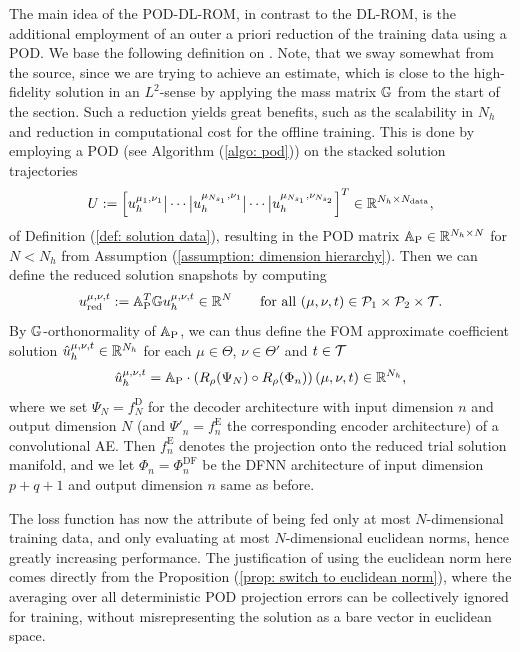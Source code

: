 The main idea of the POD-DL-ROM, in contrast to the DL-ROM, is the additional employment of an 
outer a priori reduction of the training data using a POD. We base the following definition on \cite{fresca2022}. 
Note, that we
sway somewhat from the source, since we are trying to achieve 
an estimate, which is close to the high-fidelity solution
in an $L^2$-sense by applying the
mass matrix $\mathbb{G}$ from the start of the section.
Such a reduction yields great benefits, such as the scalability in $N_h$ 
and reduction in computational cost for
the offline training. This is done by employing a POD (see Algorithm (\ref{algo: pod}))
on the stacked solution trajectories 
\begin{equation*}
    U := \left[u_h^{\mu_1, \nu_1} \big\vert \cdots \big\vert u_h^{\mu_{N_{s_1}}, \nu_1} \big\vert \cdots \big\vert 
    u_h^{\mu_{N_{s_1}}, \nu_{N_{s_2}}}\right]^T \in \mathbb{R}^{N_h \times N_\text{data}},
\end{equation*}
of Definition (\ref{def: solution data}), resulting in the POD matrix 
$\mathbb{A}_\text{P} \in \mathbb{R}^{N_h \times N}$ for $N < N_h$ from Assumption (\ref{assumption: dimension hierarchy}). Then we can
define the reduced solution snapshots by computing
\begin{equation*}
    u_\text{red}^{\mu, \nu, t} := \mathbb{A}_\text{P} ^T \mathbb{G} u_h^{\mu, \nu, t} \in \mathbb{R}^{N} \qquad \text{for all } (\mu, \nu, t) \in \mathcal{P}_1 \times \mathcal{P}_2 \times \mathcal{T}.
\end{equation*}
By $\mathbb{G}$-orthonormality of $\mathbb{A}_\text{P} $, we can thus define the FOM approximate coefficient solution $\hat{u}_h^{\mu, \nu, t} \in \mathbb{R}^{N_h}$ for each 
$\mu \in \Theta$, $\nu \in \Theta'$ and $t \in \mathcal{T}$
\begin{equation} \label{eq: pod-dl-rom solution}
    \hat{u}_h^{\mu, \nu, t} = \mathbb{A}_\text{P}  \cdot \left(R_\rho(\Psi_N) \circ R_\rho(\Phi_n)\right) (\mu, \nu, t) \in \mathbb{R}^{N_h},
\end{equation}
where we set $\Psi_N = f^\text{D}_{N}$ for the decoder architecture with input dimension $n$ and output dimension $N$
(and $\Psi'_n = f^\text{E}_n$ the corresponding encoder architecture) of a convolutional AE. 
Then $f^\text{E}_n$ denotes the projection onto the reduced trial solution manifold, and we 
let $\Phi_n = \Phi_n^\text{DF}$  
be the DFNN architecture of input dimension $p + q + 1$ and output dimension $n$ same as before.

The loss function has now the attribute of being fed only at most $N$-dimensional training data, and only
evaluating at most $N$-dimensional euclidean norms, hence greatly 
increasing performance. The justification of using the euclidean norm here
comes directly from the Proposition (\ref{prop: switch to euclidean norm}),
where the averaging over all deterministic POD projection errors can be collectively ignored for training,
without misrepresenting the solution as a bare vector in euclidean space.

